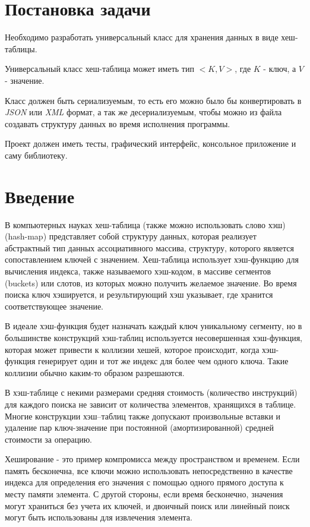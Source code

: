 
\section*{Постановка задачи}
Необходимо разработать универсальный класс для хранения данных в виде хеш-таблицы.

Универсальный класс хеш-таблица может иметь тип $<K, V>$, где $K$ - ключ, а $V$ - значение.

Класс должен быть сериализуемым, то есть его можно было бы конвертировать в \textit{JSON} или \textit{XML} формат, а так же десериализуемым, чтобы можно из файла создавать структуру данных во время исполнения программы.

Проект должен иметь тесты, графический интерфейс, консольное приложение и саму библиотеку.

\newpage
\section{Введение}

В компьютерных науках хеш-таблица (также можно использовать слово хэш) (hash-map) представляет собой структуру данных, которая реализует абстрактный тип данных ассоциативного массива, структуру, которого является сопоставлением ключей с значением.
Хеш-таблица использует хэш-функцию для вычисления индекса, также называемого хэш-кодом, в массиве сегментов (buckets) или слотов, из которых можно получить желаемое значение. 
Во время поиска ключ хэшируется, и результирующий хэш указывает, где хранится соответствующее значение.

В идеале хэш-функция будет назначать каждый ключ уникальному сегменту, но в большинстве конструкций хэш-таблиц используется несовершенная хэш-функция, которая может привести к коллизии хешей, которое происходит, когда хэш-функция генерирует один и тот же индекс для более чем одного ключа. 
Такие коллизии обычно каким-то образом разрешаются.

В хэш-таблице с некими размерами средняя стоимость (количество инструкций) для каждого поиска не зависит от количества элементов, хранящихся в таблице.
Многие конструкции хэш–таблиц также допускают произвольные вставки и удаление пар ключ-значение при постоянной (амортизированной) средней стоимости за операцию.

Хеширование - это пример компромисса между пространством и временем. 
Если память бесконечна, все ключи можно использовать непосредственно в качестве индекса для определения его значения с помощью одного прямого доступа к месту памяти элемента. 
С другой стороны, если время бесконечно, значения могут храниться без учета их ключей, и двоичный поиск или линейный поиск могут быть использованы для извлечения элемента.


